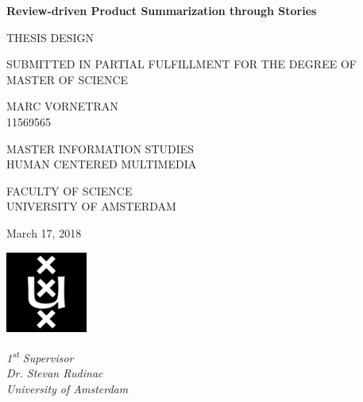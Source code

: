 \begin{titlepage}
    \begin{center}
    
        \Huge
        \textbf{Review-driven Product Summarization through Stories}
        
        \vspace{0.5cm}
        \LARGE
        THESIS DESIGN
        
        \vspace{1.5cm}
        
        SUBMITTED IN PARTIAL FULFILLMENT FOR THE DEGREE OF\\
        MASTER OF SCIENCE
        
        \vspace{1cm}
        
        MARC VORNETRAN\\
        11569565
        
        \vspace{1.5cm}
        
        MASTER INFORMATION STUDIES\\
        HUMAN CENTERED MULTIMEDIA
        
        \vspace{1cm}
        
        FACULTY OF SCIENCE\\
        UNIVERSITY OF AMSTERDAM
        
        \vspace{1.5cm}
        
        March 17, 2018
        
        \vspace{1.5cm}
        
        \includegraphics[width=0.2\textwidth]{assets/uva.png}
        
        \vfill
        
        \begin{minipage}[t]{1\textwidth} %
            \textit{1\textsuperscript{st} Supervisor}\\
            \textit{Dr. Stevan Rudinac}\\
            \textit{University of Amsterdam}
        \end{minipage}
        \hfill
        
    \end{center}
\end{titlepage}